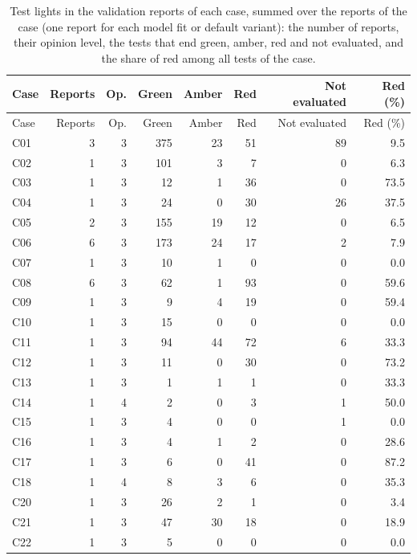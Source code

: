 {\footnotesize
\setlength{\tabcolsep}{3pt}
\renewcommand{\arraystretch}{1.12}
\begin{longtable}{lrrrrrrr}
\caption{Test lights in the validation reports of each case, summed over the reports of the case (one report for each model fit or default variant): the number of reports, their opinion level, the tests that end green, amber, red and not evaluated, and the share of red among all tests of the case.}\label{tab:results-lights}\\
\toprule
Case & Reports & Op. & Green & Amber & Red & Not evaluated & Red (\%) \\
\midrule
\endfirsthead
\toprule
Case & Reports & Op. & Green & Amber & Red & Not evaluated & Red (\%) \\
\midrule
\endhead
\bottomrule
\endfoot
C01 & 3 & 3 & 375 & 23 & 51 & 89 & 9.5 \\
C02 & 1 & 3 & 101 & 3 & 7 & 0 & 6.3 \\
C03 & 1 & 3 & 12 & 1 & 36 & 0 & 73.5 \\
C04 & 1 & 3 & 24 & 0 & 30 & 26 & 37.5 \\
C05 & 2 & 3 & 155 & 19 & 12 & 0 & 6.5 \\
C06 & 6 & 3 & 173 & 24 & 17 & 2 & 7.9 \\
C07 & 1 & 3 & 10 & 1 & 0 & 0 & 0.0 \\
C08 & 6 & 3 & 62 & 1 & 93 & 0 & 59.6 \\
C09 & 1 & 3 & 9 & 4 & 19 & 0 & 59.4 \\
C10 & 1 & 3 & 15 & 0 & 0 & 0 & 0.0 \\
C11 & 1 & 3 & 94 & 44 & 72 & 6 & 33.3 \\
C12 & 1 & 3 & 11 & 0 & 30 & 0 & 73.2 \\
C13 & 1 & 3 & 1 & 1 & 1 & 0 & 33.3 \\
C14 & 1 & 4 & 2 & 0 & 3 & 1 & 50.0 \\
C15 & 1 & 3 & 4 & 0 & 0 & 1 & 0.0 \\
C16 & 1 & 3 & 4 & 1 & 2 & 0 & 28.6 \\
C17 & 1 & 3 & 6 & 0 & 41 & 0 & 87.2 \\
C18 & 1 & 4 & 8 & 3 & 6 & 0 & 35.3 \\
C20 & 1 & 3 & 26 & 2 & 1 & 0 & 3.4 \\
C21 & 1 & 3 & 47 & 30 & 18 & 0 & 18.9 \\
C22 & 1 & 3 & 5 & 0 & 0 & 0 & 0.0 \\
\end{longtable}
}
